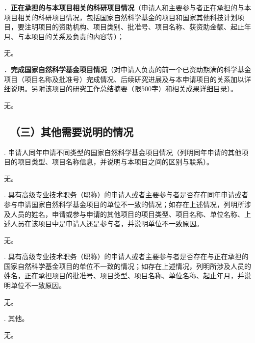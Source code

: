 {\sihao \color{MsBlue} ．{\bfseries 正在承担的与本项目相关的科研项目情况}（申请人和主要参与者正在承担的与本项目相关的科研项目情况，包括国家自然科学基金的项目和国家其他科技计划项目，要注明项目的资助机构、项目类别、批准号、项目名称、获资助金额、起止年月、与本项目的关系及负责的内容等）；}

无。

{\sihao \color{MsBlue} ．{\bfseries 完成国家自然科学基金项目情况}（对申请人负责的前一个已资助期满的科学基金项目（项目名称及批准号）完成情况、后续研究进展及与本申请项目的关系加以详细说明。另附该项目的研究工作总结摘要（限500字）和相关成果详细目录）。}

无。

{\color{MsBlue} \subsection{\sihao \kaishu \quad \ （三）其他需要说明的情况 }}

{\sihao \color{MsBlue} . 申请人同年申请不同类型的国家自然科学基金项目情况（列明同年申请的其他项目的项目类型、项目名称信息，并说明与本项目之间的区别与联系）。 }

无。

{\sihao \color{MsBlue} . 具有高级专业技术职务（职称）的申请人或者主要参与者是否存在同年申请或者参与申请国家自然科学基金项目的单位不一致的情况；如存在上述情况，列明所涉及人员的姓名，申请或参与申请的其他项目的项目类型、项目名称、单位名称、上述人员在该项目中是申请人还是参与者，并说明单位不一致原因。}

无。

{\sihao \color{MsBlue} . 具有高级专业技术职务（职称）的申请人或者主要参与者是否存在与正在承担的国家自然科学基金项目的单位不一致的情况；如存在上述情况，列明所涉及人员的姓名，正在承担项目的批准号、项目类型、项目名称、单位名称、起止年月，并说明单位不一致原因。}

无。

{\sihao \color{MsBlue} . 其他。}

无。